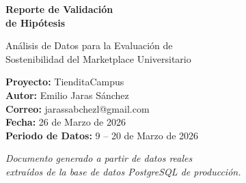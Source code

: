 \documentclass[12pt, a4paper]{article}
\begin{document}
\begin{titlepage}
    \centering
    \vspace*{2cm}
    
    
    \vspace{1.5cm}
    
    {\Huge\bfseries\textcolor{primaryblue}{Reporte de Validación\\[0.3cm] de Hipótesis}}
    
    \vspace{0.8cm}
    
    {\Large\textcolor{primaryblue!70}{Análisis de Datos para la Evaluación de\\Sostenibilidad del Marketplace Universitario}}
    
    \vspace{1.5cm}
    
    
    \vspace{1.5cm}
    
    {\large\textbf{Proyecto:} TienditaCampus}\\[0.3cm]
    {\large\textbf{Autor:} Emilio Jaras Sánchez}\\[0.3cm]
    {\large\textbf{Correo:} jarassabchezl@gmail.com}\\[0.3cm]
    {\large\textbf{Fecha:} 26 de Marzo de 2026}\\[0.3cm]
    {\large\textbf{Periodo de Datos:} 9 -- 20 de Marzo de 2026}
    
    \vspace{1.5cm}
    
    
    \vspace{1cm}
    
    {\normalsize\textit{Documento generado a partir de datos reales\\extraídos de la base de datos PostgreSQL de producción.}}
    
\end{titlepage}
\end{document}

